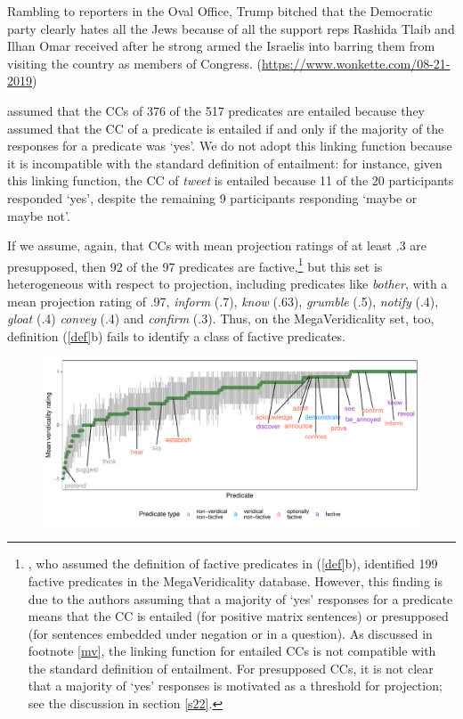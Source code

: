 \documentclass[11pt,fleqn]{article}
\newcommand{\6}{\mbox{$[\hspace*{-.6mm}[$}}
\newcommand{\9}{\mbox{$]\hspace*{-.6mm}]$}}
\begin{document}
{{\begin{exe}
 Rambling to reporters in the Oval Office, Trump bitched that the Democratic party clearly hates all the Jews because of all the support reps Rashida Tlaib and Ilhan Omar received after he strong armed the Israelis into barring them from visiting the country as members of Congress. (\url{https://www.wonkette.com/08-21-2019})
\end{exe}
\citet{white-rawlins-nels2018} assumed that the CCs of 376 of the 517 predicates are entailed because they assumed that the CC of a predicate is entailed if and only if the majority of the responses for a predicate was `yes'. We do not adopt this linking function because it is incompatible with the standard definition of entailment: for instance, given this linking function, the CC of {\em tweet} is entailed because 11 of the 20 participants responded `yes', despite the remaining 9 participants responding `maybe or maybe not'.} If we assume, again, that CCs with mean projection ratings of at least .3 are presupposed, then 92 of the 97 predicates are factive,\footnote{\citet{white-rawlins-nels2018}, who assumed the definition of factive predicates in (\ref{def}b), identified 199 factive predicates in the MegaVeridicality database. However,  this finding is due to the authors assuming that a majority of `yes' responses for a predicate means that the CC is entailed (for positive matrix sentences) or presupposed (for sentences embedded under negation or in a question). As discussed in footnote \ref{mv}, the linking function for entailed CCs is not compatible with the standard definition of entailment. For presupposed CCs, it is not clear that a majority of `yes' responses is motivated as a threshold for projection; see the discussion in section \ref{s22}.} 
 but this set is heterogeneous with respect to projection, including predicates like {\em bother}, with a mean projection rating of .97, {\em inform} (.7), {\em know} (.63), {\em grumble} (.5), {\em notify} (.4), {\em gloat} (.4) {\em convey} (.4) and {\em confirm} (.3). Thus, on the MegaVeridicality set, too, definition (\ref{def}b) fails to identify a class of factive predicates.

\begin{figure}[H]
\centering
\includegraphics[width=.75\paperwidth]{../../MegaVeridicality-analysis/graphs/means-entailment-by-predicate}


\end{figure}}
\end{document}
